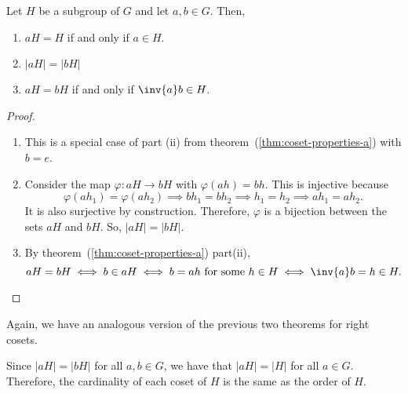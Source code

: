 \documentclass[11pt]{penrose}
\begin{document}
\begin{nthm}
    Let $H$ be a subgroup of $G$ and let $a, b \in G$. Then,
    \begin{enumerate}[label=(\roman*)]
        \item $aH = H$ if and only if $a \in H$.
        \item $|aH| = |bH|$
        \item $aH = bH$ if and only if $\inv{a} b \in H$.
    \end{enumerate}
\end{nthm}
\begin{proof}
    \begin{enumerate}[label=(\roman*)]
        \item This is a special case of part (ii) from theorem~(\ref{thm:coset-properties-a}) with $b = e$.

        \item Consider the map $\varphi : aH \to bH$ with $\varphi(ah) = bh$. This is injective because
        \begin{equation*}
            \varphi(ah_1) = \varphi(ah_2)
            \implies bh_1 = bh_2
            \implies h_1 = h_2
            \implies ah_1 = ah_2.
        \end{equation*}
        It is also surjective by construction. Therefore, $\varphi$ is a bijection between the sets $aH$ and $bH$. So, $|aH| = |bH|$.

        \item By theorem~(\ref{thm:coset-properties-a}) part(ii),
        \begin{equation*}
            aH = bH
            \iff b \in aH
            \iff b = ah \text{ for some } h \in H
            \iff \inv{a} b = h \in H.
            \qedhere
        \end{equation*}
    \end{enumerate}
\end{proof}

Again, we have an analogous version of the previous two theorems for right cosets.

\begin{remark}
    Since $|aH| = |bH|$ for all $a, b \in G$, we have that $|aH| = |H|$ for all $a \in G$. Therefore, the cardinality of each coset of $H$ is the same as the order of $H$.
\end{remark}
\end{document}
